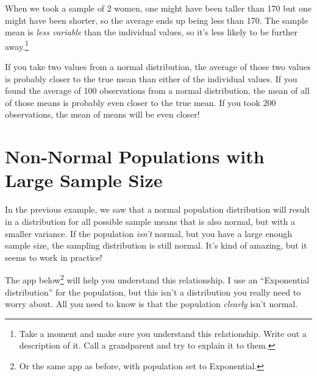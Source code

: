 \documentclass[
  letterpaper,
  DIV=11,
  numbers=noendperiod,
  oneside]{scrreprt}
\begin{document}
When we took a sample of 2 women, one might have been taller than 170
but one might have been shorter, so the average ends up being less than
170. The sample mean is \emph{less variable} than the individual values,
so it's less likely to be further away.\footnote{Take a moment and make
  sure you understand this relationship. Write out a description of it.
  Call a grandparent and try to explain it to them.}

\begin{tcolorbox}[enhanced jigsaw, toprule=.15mm, colbacktitle=quarto-callout-note-color!10!white, title=\textcolor{quarto-callout-note-color}{\faInfo}\hspace{0.5em}{Summary}, arc=.35mm, colframe=quarto-callout-note-color-frame, colback=white, titlerule=0mm, left=2mm, bottomtitle=1mm, bottomrule=.15mm, breakable, opacitybacktitle=0.6, leftrule=.75mm, toptitle=1mm, coltitle=black, rightrule=.15mm, opacityback=0]

If you take two values from a normal distribution, the average of those
two values is probably closer to the true mean than either of the
individual values. If you found the average of 100 observations from a
normal distribution, the mean of all of those means is probably even
closer to the true mean. If you took 200 observations, the mean of means
will be even closer!

\end{tcolorbox}

\hypertarget{non-normal-populations-with-large-sample-size}{%
\section{Non-Normal Populations with Large Sample
Size}\label{non-normal-populations-with-large-sample-size}}

In the previous example, we saw that a normal population distribution
will result in a distribution for all possible sample means that is also
normal, but with a smaller variance. If the population \emph{isn't}
normal, but you have a large enough sample size, the sampling
distribution is still normal. It's kind of amazing, but it seems to work
in practice!

The app below\footnote{Or the same app as before, with population set to
  Exponential.} will help you understand this relationship. I use an
``Exponential distribution'' for the population, but this isn't a
distribution you really need to worry about. All you need to know is
that the population \emph{clearly} isn't normal.
\end{document}
